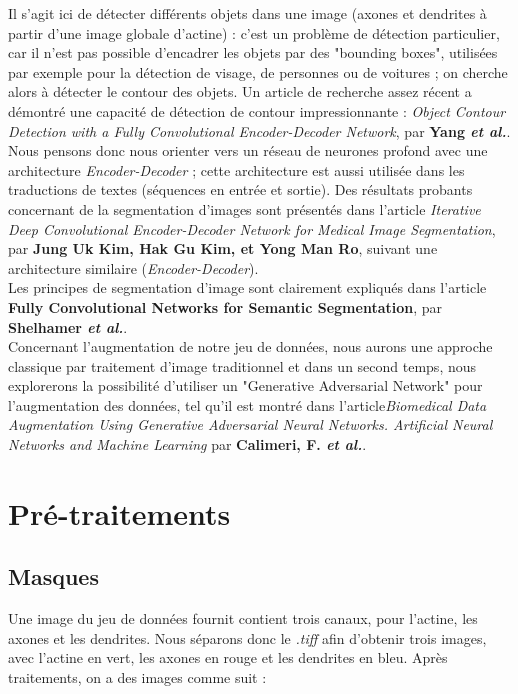 \documentclass{report}
\begin{document}
Il s'agit ici de détecter différents objets dans une image (axones et dendrites
à partir d'une image globale d'actine) : c'est un problème de détection particulier,
car il n'est pas possible d'encadrer les objets par des "bounding boxes", utilisées
par exemple pour la détection de visage, de personnes ou de voitures ; on cherche
alors à détecter le contour des objets. Un article de recherche assez récent a
démontré une capacité de détection de contour impressionnante : \textit{Object Contour
 Detection with a Fully Convolutional Encoder-Decoder Network}, par \textbf{Yang
 \textit{et al.}}. Nous pensons donc nous orienter vers un réseau de neurones profond
avec une architecture \textit{Encoder-Decoder} ; cette architecture est aussi
utilisée dans les traductions de textes (séquences en entrée et sortie). Des résultats
probants concernant de la segmentation d'images sont présentés dans l'article
\textit{Iterative Deep Convolutional Encoder-Decoder Network for Medical Image
 Segmentation}, par \textbf{Jung Uk Kim, Hak Gu Kim, et Yong Man Ro}, suivant une
architecture similaire (\textit{Encoder-Decoder}). \\
Les principes de segmentation d'image sont clairement expliqués dans l'article
\textbf{Fully Convolutional Networks for Semantic Segmentation}, par \textbf{Shelhamer
 \textit{et al.}}. \\
Concernant l’augmentation de notre jeu de données, nous aurons une approche
classique par traitement d’image traditionnel et dans un second temps, nous
explorerons la possibilité d'utiliser un "Generative Adversarial Network" pour l’augmentation
des données, tel qu'il est montré dans l'article\textit{Biomedical Data Augmentation Using
Generative Adversarial Neural Networks. Artificial Neural Networks and Machine
Learning} par \textbf{Calimeri, F.
 \textit{et al.}}.


\chapter{Pré-traitements}

\section{Masques}

Une image du jeu de données fournit contient trois canaux, pour l'actine, les axones
et les dendrites. Nous séparons donc le \textit{.tiff} afin d'obtenir trois images,
avec l'actine en vert, les axones en rouge et les dendrites en bleu. Après traitements,
on a des images comme suit :
\end{document}
